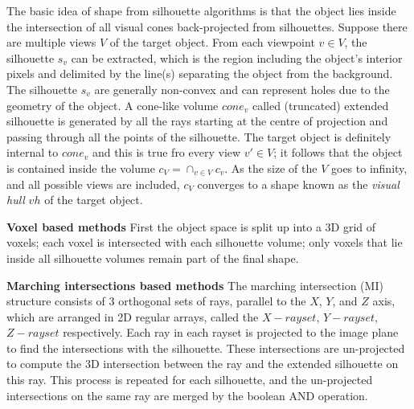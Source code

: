 The basic idea of shape from silhouette algorithms is that the object lies inside the intersection of all visual cones back-projected from silhouettes. Suppose there are multiple views $V$ of the target object. From each viewpoint $v\in V$, the silhouette $s_v$ can be extracted, which is the region including the object's interior pixels and delimited by the line(s) separating the object from the background. The silhouette $s_v$ are generally non-convex and can represent holes due to the geometry of the object. A cone-like volume $cone_v$ called (truncated) extended silhouette is generated by all the rays starting at the centre of projection and passing through all the points of the silhouette. The target object is definitely internal to $cone_v$ and this is true fro every view $v'\in V$; it follows that the object is contained inside the volume $c_V=\cap_{v\in V}c_v$. As the size of the $V$ goes to infinity, and all possible views are included, $c_V$ converges to a shape known as the \textit{visual hull} $vh$ of the target object.



\textbf {Voxel based methods} 
First the object space is split up into a 3D grid of voxels; each voxel is intersected with each silhouette volume; only voxels that lie inside all silhouette volumes remain part of the final shape.

\textbf{Marching intersections based methods} 
The marching intersection (MI) structure consists of 3 orthogonal sets of rays, parallel to the $X$, $Y$, and $Z$ axis, which are arranged in 2D regular arrays, called the $X-rayset$, $Y-rayset$, $Z-rayset$ respectively. Each ray in each rayset is projected to the image plane to find the intersections with the silhouette. These intersections are un-projected to compute the 3D intersection between the ray and the extended silhouette on this ray. This process is repeated for each silhouette, and the un-projected intersections on the same ray are merged by the boolean AND operation.

